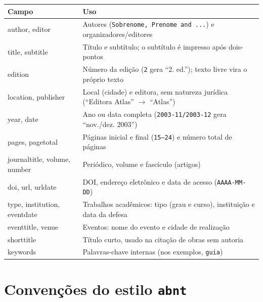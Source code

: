 \begin{quadro}[htbp]
\begin{ilustracao}{\caption{Campos do biblatex mais usados nas entradas}\label{qua:campos}}{}
  \renewcommand{\arraystretch}{1.2}
  \small
  \begin{tabularx}{\textwidth}{|>{\ttfamily\raggedright\arraybackslash}p{3.2cm}|X|}
    \hline
    \textnormal{\textbf{Campo}} & \textbf{Uso} \\
    \hline
    author, editor & Autores (\texttt{Sobrenome, Prenome and ...}) e organizadores/editores \\
    \hline
    title, subtitle & Título e subtítulo; o subtítulo é impresso após dois-pontos \\
    \hline
    edition & Número da edição (\texttt{2} gera ``2. ed.''); texto livre vira o próprio texto \\
    \hline
    location, publisher & Local (cidade) e editora, sem natureza jurídica (``Editora Atlas'' $\to$ ``Atlas'') \\
    \hline
    year, date & Ano ou data completa (\texttt{2003-11/2003-12} gera ``nov./dez. 2003'') \\
    \hline
    pages, pagetotal & Páginas inicial e final (\texttt{15--24}) e número total de páginas \\
    \hline
    journaltitle, volume, number & Periódico, volume e fascículo (artigos) \\
    \hline
    doi, url, urldate & DOI, endereço eletrônico e data de acesso (\texttt{AAAA-MM-DD}) \\
    \hline
    type, institution, eventdate & Trabalhos acadêmicos: tipo (grau e curso), instituição e data da defesa \\
    \hline
    eventtitle, venue & Eventos: nome do evento e cidade de realização \\
    \hline
    shorttitle & Título curto, usado na citação de obras sem autoria \\
    \hline
    keywords & Palavras-chave internas (nos exemplos, \texttt{guia}) \\
    \hline
  \end{tabularx}
\end{ilustracao}
\end{quadro}

\section{Convenções do estilo \texttt{abnt}}

